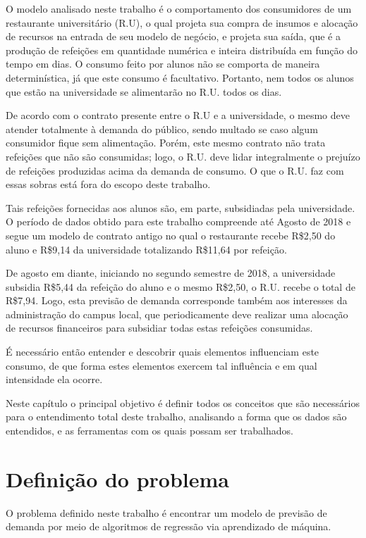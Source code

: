 \documentclass[	12pt, Times, openright, twoside, a4paper, english, brazil]{abntex2}
\begin{document}
        O modelo analisado neste trabalho é o comportamento dos consumidores de um restaurante universitário (R.U), o qual projeta sua compra de insumos e alocação de recursos na entrada de seu modelo de negócio, e projeta sua saída, que é a produção de refeições em quantidade numérica e inteira distribuída em função do tempo em dias. O consumo feito por alunos não se comporta de maneira determinística, já que este consumo é facultativo. Portanto, nem todos os alunos que estão na universidade se alimentarão no R.U. todos os dias.

        De acordo com o contrato presente entre o R.U e a universidade, o mesmo deve atender totalmente à demanda do público, sendo multado se caso algum consumidor fique sem alimentação. Porém, este mesmo contrato não trata refeições que não são consumidas; logo, o R.U. deve lidar integralmente o prejuízo de refeições produzidas acima da demanda de consumo. O que o R.U. faz com essas sobras está fora do escopo deste trabalho.

        Tais refeições fornecidas aos alunos são, em parte, subsidiadas pela universidade. O período de dados obtido para este trabalho compreende até Agosto de 2018 e segue um modelo de contrato antigo no qual o restaurante recebe R\$2,50 do aluno e R\$9,14 da universidade totalizando R\$11,64 por refeição.

        De agosto em diante, iniciando no segundo semestre de 2018, a universidade subsidia R\$5,44 da refeição do aluno e o mesmo R\$2,50, o R.U. recebe o total de R\$7,94. Logo, esta previsão de demanda corresponde também aos interesses da administração do campus local, que periodicamente deve realizar uma alocação de recursos financeiros para subsidiar todas estas refeições consumidas.

        É necessário então entender e descobrir quais elementos influenciam este consumo, de que forma estes elementos exercem tal influência e em qual intensidade ela ocorre.

        Neste capítulo o principal objetivo é definir todos os conceitos que são necessários para o entendimento total deste trabalho, analisando a forma que os dados são entendidos, e as ferramentas com os quais possam ser trabalhados.        

      \section{Definição do problema}
        O problema definido neste trabalho é encontrar um modelo de previsão de demanda por meio de algoritmos de regressão via aprendizado de máquina.
\end{document}
